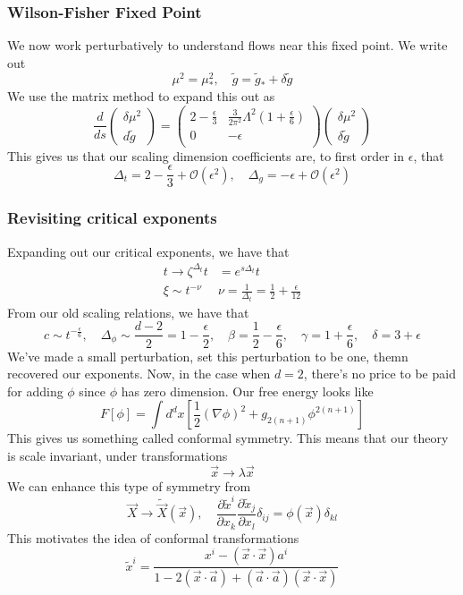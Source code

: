 \subsubsection{Wilson-Fisher Fixed Point} 
We now work perturbatively 
to understand flows near this fixed point. 
We write out 
\[
 \mu ^ 2 = \mu ^ 2 _ * , \quad 
 \tilde{ g } = \tilde{ g } _ * + \delta \tilde{ g }    
\]  We use 
the matrix method to expand this out 
as 
\[
 \frac{d }{ ds } \begin{pmatrix} \delta \mu ^ 2 \\ 
 d \tilde{ g } \end{pmatrix}  = \begin{pmatrix}  
 2 - \frac{\epsilon}{3  } & \frac{ 3 }{ 2 \pi ^ 2 } \Lambda ^ 2 
 ( 1 + \frac{\epsilon }{ 6 } )  \\ 
 0 & - \epsilon  \\ \end{pmatrix} \begin{pmatrix} \delta \mu ^ 2 \\
 \delta \tilde{ g } \end{pmatrix} 
\] This gives us that 
our scaling dimension coefficients 
are, to first order in $ \epsilon $, 
that 
\[
	\Delta _ t = 2 - \frac{ \epsilon }{ 3 } + \mathcal{ O } ( \epsilon ^2 ) , 
	\quad \Delta _g = - \epsilon + \mathcal{ O  } ( \epsilon ^ 2 )  
\] 

\subsubsection{Revisiting critical exponents} 
Expanding out our critical exponents, 
we have that 
\begin{align*}
	t \to \zeta ^{ \Delta _ t  }  t & = e^{ s \Delta _ t } t  \\
	\xi \sim t ^{ - \nu } & \nu = \frac{1 }{ \Delta _ t } = \frac{1}{2 } 
	+ \frac{ \epsilon }{ 12 } 
\end{align*}
From our old scaling relations, we have that 
\[
 c \sim t ^{ - \frac{ \epsilon }{ 6}  }, \quad 
 \Delta _{ \phi } \sim \frac{ d - 2}{2 }  = 1 - \frac{ \epsilon   }{ 2 }, 
 \quad \beta = \frac{1}{2 } - \frac{ \epsilon }{ 6 }, \quad 
 \gamma =  1 + \frac{ \epsilon }{ 6 } , \quad
 \delta = 3 + \epsilon 
\] We've made a small perturbation, set this perturbation 
to be one, themn recovered our exponents. 
Now, in the case when $ d =  2 $, there's 
no price to be paid for adding $ \phi $ since 
$ \phi $ has zero dimension. 
Our free energy looks like 
\[
 F [ \phi ] = \int d ^ d x \left[  
 \frac{1}{2 } ( \nabla \phi ) ^ 2  + g_{ 2 ( n + 1 )} \phi ^{ 2 ( n + 1 ) }\right] 
\]
This gives us something called conformal symmetry. 
This means that our theory is scale invariant, 
under transformations 
\[
 \vec{x} \to \lambda \vec{x}
\] We can enhance this type of symmetry 
from 
\[
	\vec{X} \to \tilde{\vec{X} } ( \vec{x} )  , \quad 
	\frac{\partial \tilde{ x } ^ i  }{\partial  x_ k }
	\frac{\partial  \tilde{ x } _ j  }{\partial  x _ l } \delta _{ ij }
	= \phi ( \vec{x} ) \delta _{ kl }
\]  This motivates the idea of 
conformal transformations 
\[
	\tilde{ x } ^ i = \frac{x ^ i - ( \vec{x} \cdot  \vec{x} ) a ^ i }{
	1 - 2 ( \vec{x} \cdot  \vec{a} ) + ( \vec{a} \cdot  \vec{a} ) ( \vec{x} \cdot  \vec{x} )  } 
\] 

